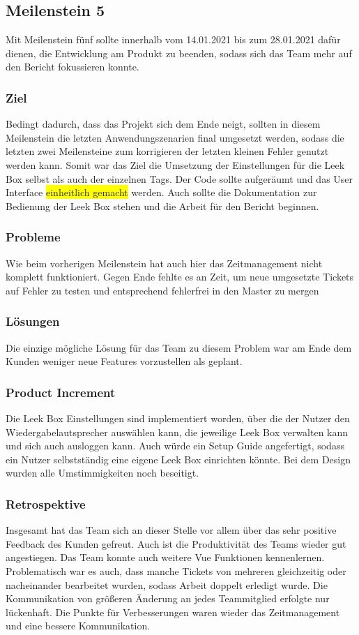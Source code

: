 \documentclass[10pt, a4paper, draft]{article}
\begin{document}
\subsection{Meilenstein 5}
Mit Meilenstein fünf sollte innerhalb vom 14.01.2021 bis zum 28.01.2021 dafür dienen, die Entwicklung am Produkt zu beenden, sodass sich das Team mehr auf den Bericht fokussieren konnte.
\subsubsection{Ziel}
Bedingt dadurch, dass das Projekt sich dem Ende neigt, sollten in diesem Meilenstein die letzten Anwendungszenarien final umgesetzt werden, sodass die letzten zwei Meilensteine zum korrigieren der letzten kleinen Fehler genutzt werden kann.
Somit war das Ziel die Umsetzung der Einstellungen für die Leek Box selbst als auch der einzelnen Tags.
Der Code sollte aufgeräumt und das User Interface \colorbox{yellow}{einheitlich gemacht} werden.
Auch sollte die Dokumentation zur Bedienung der Leek Box stehen und die Arbeit für den Bericht beginnen.
\subsubsection{Probleme}
Wie beim vorherigen Meilenstein hat auch hier das Zeitmanagement nicht komplett funktioniert.
Gegen Ende fehlte es an Zeit, um neue umgesetzte Tickets auf Fehler zu testen und entsprechend fehlerfrei in den Master zu mergen
\subsubsection{Lösungen}
Die einzige mögliche Lösung für das Team zu diesem Problem war am Ende dem Kunden weniger neue Features vorzustellen als geplant.
\subsubsection{Product Increment}
Die Leek Box Einstellungen sind implementiert worden, über die der Nutzer den Wiedergabelautsprecher auswählen kann, die jeweilige Leek Box verwalten kann und sich auch ausloggen kann.
Auch würde ein Setup Guide angefertigt, sodass ein Nutzer selbstständig eine eigene Leek Box einrichten könnte.
Bei dem Design wurden alle Umstimmigkeiten noch beseitigt.
\subsubsection{Retrospektive}
Insgesamt hat das Team sich an dieser Stelle vor allem über das sehr positive Feedback des Kunden gefreut.
Auch ist die Produktivität des Teams wieder gut angestiegen.
Das Team konnte auch weitere Vue Funktionen kennenlernen.
Problematisch war es auch, dass manche Tickets von mehreren gleichzeitig oder nacheinander bearbeitet wurden, sodass Arbeit doppelt erledigt wurde.
Die Kommunikation von größeren Änderung an jedes Teammitglied erfolgte nur lückenhaft.
Die Punkte für Verbesserungen waren wieder das Zeitmanagement und eine bessere Kommunikation.
\end{document}
